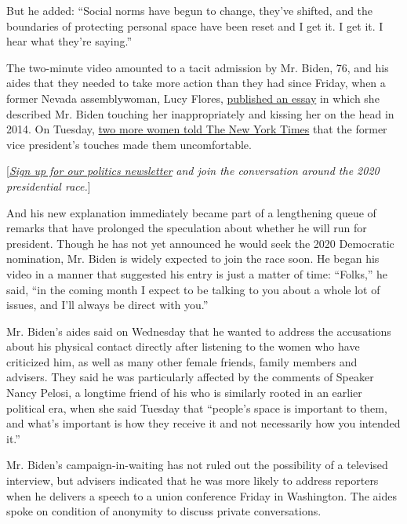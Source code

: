 But he added: ``Social norms have begun to change, they've shifted, and
the boundaries of protecting personal space have been reset and I get
it. I get it. I hear what they're saying.''

The two-minute video amounted to a tacit admission by Mr. Biden, 76, and
his aides that they needed to take more action than they had since
Friday, when a former Nevada assemblywoman, Lucy Flores,
\href{https://www.nytimes3xbfgragh.onion/2019/03/30/us/politics/joe-biden-lucy-flores-news.html}{published
an essay} in which she described Mr. Biden touching her inappropriately
and kissing her on the head in 2014. On Tuesday,
\href{https://www.nytimes3xbfgragh.onion/2019/04/02/us/politics/joe-biden-women-me-too.html}{two
more women told The New York Times} that the former vice president's
touches made them uncomfortable.

{[}\href{https://www.nytimes3xbfgragh.onion/newsletters/politics?smid=rd\%3Faction\%3Dclick\&module=inline\&pgtype=Article}{\emph{Sign
up for our politics newsletter}} \emph{and join the conversation around
the 2020 presidential race.}{]}

And his new explanation immediately became part of a lengthening queue
of remarks that have prolonged the speculation about whether he will run
for president. Though he has not yet announced he would seek the 2020
Democratic nomination, Mr. Biden is widely expected to join the race
soon. He began his video in a manner that suggested his entry is just a
matter of time: ``Folks,'' he said, ``in the coming month I expect to be
talking to you about a whole lot of issues, and I'll always be direct
with you.''

Mr. Biden's aides said on Wednesday that he wanted to address the
accusations about his physical contact directly after listening to the
women who have criticized him, as well as many other female friends,
family members and advisers. They said he was particularly affected by
the comments of Speaker Nancy Pelosi, a longtime friend of his who is
similarly rooted in an earlier political era, when she said Tuesday that
``people's space is important to them, and what's important is how they
receive it and not necessarily how you intended it.''

Mr. Biden's campaign-in-waiting has not ruled out the possibility of a
televised interview, but advisers indicated that he was more likely to
address reporters when he delivers a speech to a union conference Friday
in Washington. The aides spoke on condition of anonymity to discuss
private conversations.

